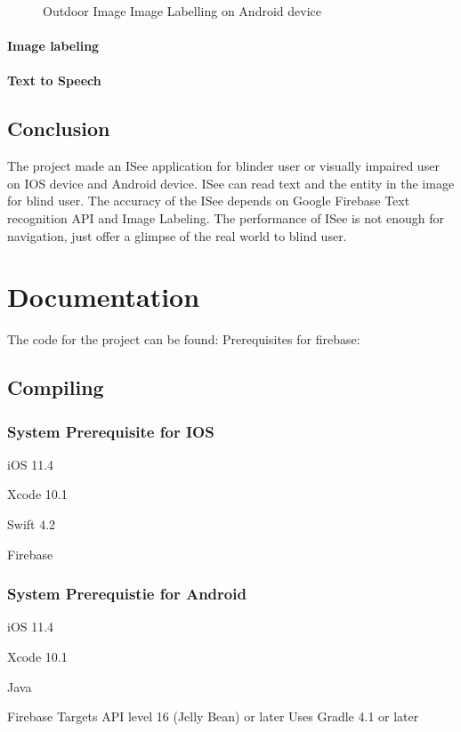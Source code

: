\documentclass[11pt]{ucscthesis}
\begin{document}
\begin{figure}
  \hfill
\caption{Outdoor Image Image Labelling on Android device}
\end{figure}
\subsection{Image labeling}



\subsection{Text to Speech}



\chapter{Conclusion}
The project made an ISee application for blinder user or visually impaired user on IOS device and Android device. ISee can read text and the entity in the image for blind user. The accuracy of the ISee depends on Google Firebase Text recognition API and Image Labeling. The performance of ISee is not enough for navigation, just offer a glimpse of the real world to blind user.


 

\part{Documentation}
The code for the project can be found:
Prerequisites for firebase:
\appendix
\chapter{Compiling}
\section{System Prerequisite for IOS}
\item[iOS 11.4]
\item[Xcode 10.1]
\item[Swift 4.2]
\item[Firebase]

\section{System Prerequistie for Android}
\item[iOS 11.4]
\item[Xcode 10.1]
\item[Java]
\item[Firebase Targets API level 16 (Jelly Bean) or later
Uses Gradle 4.1 or later]
\end{document}
